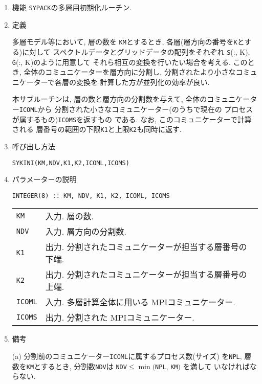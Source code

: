 \documentclass[a4j]{jsarticle}
\begin{document}
\begin{enumerate}

\item 機能
\texttt{SYPACK}の多層用初期化ルーチン.

\item 定義

多層モデル等において, 層の数を \texttt{KM}とするとき, 
各層(層方向の番号を\texttt{K}とする)に対して
スペクトルデータとグリッドデータの配列をそれぞれ 
{\texttt S(:, K)}, {\texttt G(:, K)}のように用意して
それら相互の変換を行いたい場合を考える. 
このとき, 全体のコミュニケーターを層方向に分割し,
分割されたより小さなコミュニケーターで各層の変換を
計算した方が並列化の効率が良い.

本サブルーチンは, 層の数と層方向の分割数を与えて, 
全体のコミュニケーター\texttt{ICOML}から
分割された小さなコミュニケーター(のうちで現在の
プロセスが属するもの)\texttt{ICOMS}を返すもの
である. なお, このコミュニケーターで計算される
層番号の範囲の下限\texttt{K1}と上限\texttt{K2}も同時に返す.
  
\item 呼び出し方法 
    
\texttt{SYKINI(KM,NDV,K1,K2,ICOML,ICOMS)}
  
\item パラメーターの説明

\begin{verbatim}  
INTEGER(8) :: KM, NDV, K1, K2, ICOML, ICOMS
\end{verbatim}  
    
\begin{tabular}{ll}
\texttt{KM} & 入力. 層の数.\\
\texttt{NDV} & 入力. 層方向の分割数.\\
\texttt{K1} & 出力. 分割されたコミュニケーターが担当する層番号の下端.\\
\texttt{K2} & 出力. 分割されたコミュニケーターが担当する層番号の上端.\\
\texttt{ICOML} & 入力. 多層計算全体に用いる MPIコミュニケーター.\\
\texttt{ICOMS} & 出力. 分割された MPIコミュニケーター.
\end{tabular}

\item 備考

(a) 分割前のコミュニケーター\texttt{ICOML}に属するプロセス数(サイズ)
  を\texttt{NPL}, 層数を\texttt{KM}とするとき, 分割数\texttt{NDV}は
  \texttt{NDV}$\le \min($\texttt{NPL}, \texttt{KM}$)$ を満して
  いなければならない.


\end{enumerate}
\end{document}
